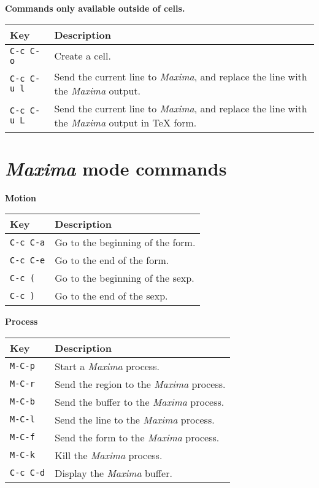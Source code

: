 \documentclass{article}
\newcommand{\mx}{\textsl{\sffamily Maxima}}
\begin{document}
\smallskip

\noindent
\textbf{Commands only available outside of cells.}

\smallskip

\noindent
\begin{tabular}{p{\firstcol}p{\secondcol}}
\hline
\textbf{Key} & \textbf{Description}\\
\hline
\texttt{C-c C-o}
& Create a cell.\\
\texttt{C-c C-u l}
& Send the current line to \mx{}, and replace the line with the
\mx{} output.\\
\texttt{C-c C-u L}
& Send the current line to \mx{}, and replace the line with the
\mx{} output in \TeX{} form.
\end{tabular}

\newpage

\section{\mx{} mode commands}


\smallskip

\noindent
\textbf{Motion}

\smallskip

\noindent
\begin{tabular}{p{\firstcol}p{\secondcol}}
\hline
\textbf{Key} & \textbf{Description}\\
\hline
\texttt{C-c C-a} & Go to the beginning of the form.\\
\texttt{C-c C-e} & Go to the end of the form.\\
\texttt{C-c (} & Go to the beginning of the sexp.\\
\texttt{C-c )} & Go to the end of the sexp.
\end{tabular}

\smallskip

\noindent
\textbf{Process}

\smallskip

\noindent
\begin{tabular}{p{\firstcol}p{\secondcol}}
\hline
\textbf{Key} & \textbf{Description}\\
\hline
\texttt{M-C-p} & Start a \mx{} process.\\
\texttt{M-C-r} & Send the region to the \mx{} process.\\
\texttt{M-C-b} & Send the buffer to the \mx{} process.\\
\texttt{M-C-l} & Send the line to the \mx{} process.\\
\texttt{M-C-f} & Send the form to the \mx{} process.\\
\texttt{M-C-k} & Kill the \mx{} process.\\
\texttt{C-c C-d} & Display the \mx{} buffer.
\end{tabular}
\end{document}
